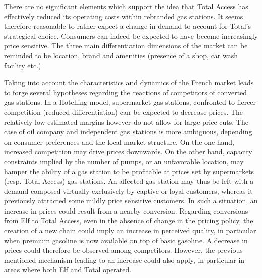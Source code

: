 \documentclass[english]{article}
\begin{document}
There are no significant elements which support the idea that Total Access has effectively reduced its operating costs within rebranded gas stations. It seems therefore reasonable to rather expect a change in demand to account for Total’s strategical choice. Consumers can indeed be expected to have become increasingly price sensitive. The three main differentiation dimensions of the market can be reminded to be location, brand and amenities (presence of a shop, car wash facility etc.).\medskip{}

Taking into account the characteristics and dynamics of the French market leads to forge several hypotheses regarding the reactions of competitors of converted gas stations. In a Hotelling model, supermarket gas stations, confronted to fiercer competition (reduced differentiation) can be expected to decrease prices. The relatively low estimated margins however do not allow for large price cuts. The case of oil company and independent gas stations is more ambiguous, depending on consumer preferences and the local market structure. On the one hand, increased competition may drive prices downwards. On the other hand, capacity constraints implied by the number of pumps, or an unfavorable location, may hamper the ability of a gas station to be profitable at prices set by supermarkets (resp. Total Access) gas stations. An affected gas station may thus be left with a demand composed virtually exclusively by captive or loyal customers, whereas it previously attracted some mildly price sensitive customers. In such a situation, an increase in prices could result from a nearby conversion. Regarding conversions from Elf to Total Access, even in the absence of change in the pricing policy, the creation of a new chain could imply an increase in perceived quality, in particular when premium gasoline is now available on top of basic gasoline. A decrease in prices could therefore be observed among competitors. However, the previous mentioned mechanism leading to an increase could also apply, in particular in areas where both Elf and Total operated. \medskip{}

\newpage
\end{document}
